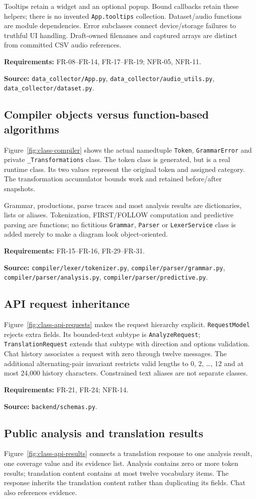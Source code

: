 \documentclass[11pt,a4paper]{article}
\newcommand{\viewtrace}[2]{\par\smallskip\noindent\textbf{Requirements:} #1.\par
  \noindent\textbf{Source:} #2.\par\medskip}
\begin{document}
Tooltips retain a widget and an optional popup. Bound callbacks retain these
helpers; there is no invented \texttt{App.tooltips} collection. Dataset/audio
functions are module dependencies. Error subclasses connect device/storage
failures to truthful UI handling. Draft-owned filenames and captured arrays
are distinct from committed CSV audio references.
\viewtrace{FR-08--FR-14, FR-17--FR-19; NFR-05, NFR-11}
{\nolinkurl{data_collector/App.py}, \nolinkurl{data_collector/audio_utils.py},
\nolinkurl{data_collector/dataset.py}}

\subsection{Compiler objects versus function-based algorithms}
Figure~\ref{fig:class-compiler} shows the actual namedtuple \texttt{Token},
\texttt{GrammarError} and private \texttt{\_Transformations} class.
The token class is generated, but is a real runtime class. Its two values
represent the original token and assigned category. The transformation
accumulator bounds work and retained before/after snapshots.

Grammar, productions, parse traces and most analysis results are dictionaries,
lists or aliases. Tokenization, FIRST/FOLLOW computation and predictive parsing
are functions; no fictitious \texttt{Grammar}, \texttt{Parser} or
\texttt{LexerService} class is added merely to make a diagram look object-oriented.
\viewtrace{FR-15--FR-16, FR-29--FR-31}
{\nolinkurl{compiler/lexer/tokenizer.py}, \nolinkurl{compiler/parser/grammar.py},
\nolinkurl{compiler/parser/analysis.py}, \nolinkurl{compiler/parser/predictive.py}}

\subsection{API request inheritance}
Figure~\ref{fig:class-api-requests} makes the request hierarchy explicit.
\nolinkurl{RequestModel} rejects extra fields. Its bounded-text subtype is
\nolinkurl{AnalyzeRequest}; \nolinkurl{TranslationRequest} extends that subtype
with direction and options validation. Chat history associates a request
with zero through twelve messages. The additional alternating-pair invariant
restricts valid lengths to 0, 2, \ldots, 12 and at most 24,000 history characters.
Constrained text aliases are not separate classes.
\viewtrace{FR-21, FR-24; NFR-14}{\nolinkurl{backend/schemas.py}}

\subsection{Public analysis and translation results}
Figure~\ref{fig:class-api-results} connects a translation response to one
analysis result, one coverage value and its evidence list. Analysis contains
zero or more token results; translation content contains at most twelve
vocabulary items. The response inherits the translation content rather than
duplicating its fields. Chat also references evidence.
\end{document}
